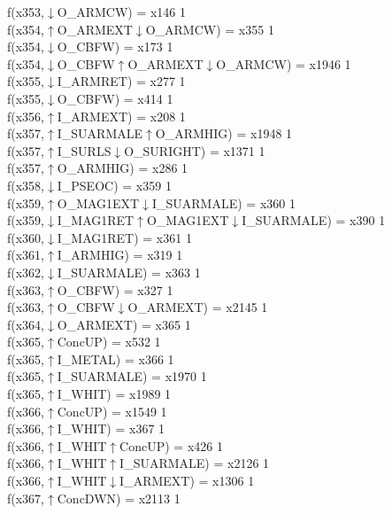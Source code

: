 f(x353,$\downarrow$O\_ARMCW) = x146 {1} \\
f(x354,$\uparrow$O\_ARMEXT$\downarrow$O\_ARMCW) = x355 {1} \\
f(x354,$\downarrow$O\_CBFW) = x173 {1} \\
f(x354,$\downarrow$O\_CBFW$\uparrow$O\_ARMEXT$\downarrow$O\_ARMCW) = x1946 {1} \\
f(x355,$\downarrow$I\_ARMRET) = x277 {1} \\
f(x355,$\downarrow$O\_CBFW) = x414 {1} \\
f(x356,$\uparrow$I\_ARMEXT) = x208 {1} \\
f(x357,$\uparrow$I\_SUARMALE$\uparrow$O\_ARMHIG) = x1948 {1} \\
f(x357,$\uparrow$I\_SURLS$\downarrow$O\_SURIGHT) = x1371 {1} \\
f(x357,$\uparrow$O\_ARMHIG) = x286 {1} \\
f(x358,$\downarrow$I\_PSEOC) = x359 {1} \\
f(x359,$\uparrow$O\_MAG1EXT$\downarrow$I\_SUARMALE) = x360 {1} \\
f(x359,$\downarrow$I\_MAG1RET$\uparrow$O\_MAG1EXT$\downarrow$I\_SUARMALE) = x390 {1} \\
f(x360,$\downarrow$I\_MAG1RET) = x361 {1} \\
f(x361,$\uparrow$I\_ARMHIG) = x319 {1} \\
f(x362,$\downarrow$I\_SUARMALE) = x363 {1} \\
f(x363,$\uparrow$O\_CBFW) = x327 {1} \\
f(x363,$\uparrow$O\_CBFW$\downarrow$O\_ARMEXT) = x2145 {1} \\
f(x364,$\downarrow$O\_ARMEXT) = x365 {1} \\
f(x365,$\uparrow$ConcUP) = x532 {1} \\
f(x365,$\uparrow$I\_METAL) = x366 {1} \\
f(x365,$\uparrow$I\_SUARMALE) = x1970 {1} \\
f(x365,$\uparrow$I\_WHIT) = x1989 {1} \\
f(x366,$\uparrow$ConcUP) = x1549 {1} \\
f(x366,$\uparrow$I\_WHIT) = x367 {1} \\
f(x366,$\uparrow$I\_WHIT$\uparrow$ConcUP) = x426 {1} \\
f(x366,$\uparrow$I\_WHIT$\uparrow$I\_SUARMALE) = x2126 {1} \\
f(x366,$\uparrow$I\_WHIT$\downarrow$I\_ARMEXT) = x1306 {1} \\
f(x367,$\uparrow$ConcDWN) = x2113 {1} \\
